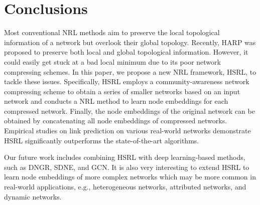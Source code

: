 \documentclass[conference]{IEEEtran}
\begin{document}
\section{Conclusions}
Most conventional NRL methods aim to preserve the local topological information of a network but overlook their global topology. Recently, HARP was proposed to preserve both local and global topological information. However, it could easily get stuck at a bad local minimum due to its poor network compressing schemes. In this paper, we propose a new NRL framework, HSRL, to tackle these issues. Specifically, HSRL employs a community-awareness network compressing scheme to obtain a series of smaller networks based on an input network and conducts a NRL method to learn node embeddings for each compressed network. Finally, the node embeddings of the original network can be obtained by concatenating all node embeddings of compressed networks. Empirical studies on link prediction on various real-world networks demonstrate HSRL significantly outperforms the state-of-the-art algorithms.

Our future work includes combining HSRL with deep learning-based methods, such as DNGR\cite{cao2016deep}, SDNE\cite{wang2016structural}, and GCN\cite{kipf2016semi}. It is also very interesting to extend HSRL to learn node embeddings of more complex networks which may be more common in real-world applications, e.g., heterogeneous networks, attributed networks, and dynamic networks. 

 
 
\end{document}
